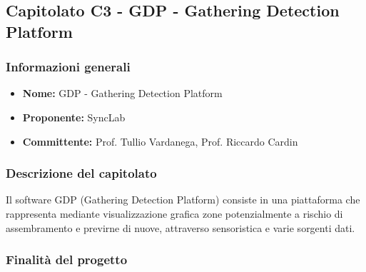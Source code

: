 \subsection{Capitolato C3 - GDP - Gathering Detection Platform}


\subsubsection{Informazioni generali}

\begin{itemize}
	\item{\textbf{Nome:}} GDP - Gathering Detection Platform
	\item{\textbf{Proponente:}} SyncLab
	\item{\textbf{Committente:}} Prof. Tullio Vardanega, Prof. Riccardo Cardin
\end{itemize}



\subsubsection{Descrizione del capitolato}

Il software GDP (Gathering Detection Platform) consiste in una piattaforma che rappresenta mediante visualizzazione grafica zone potenzialmente a rischio di assembramento e previrne di nuove, attraverso sensoristica e varie sorgenti dati.


\subsubsection{Finalità del progetto}

